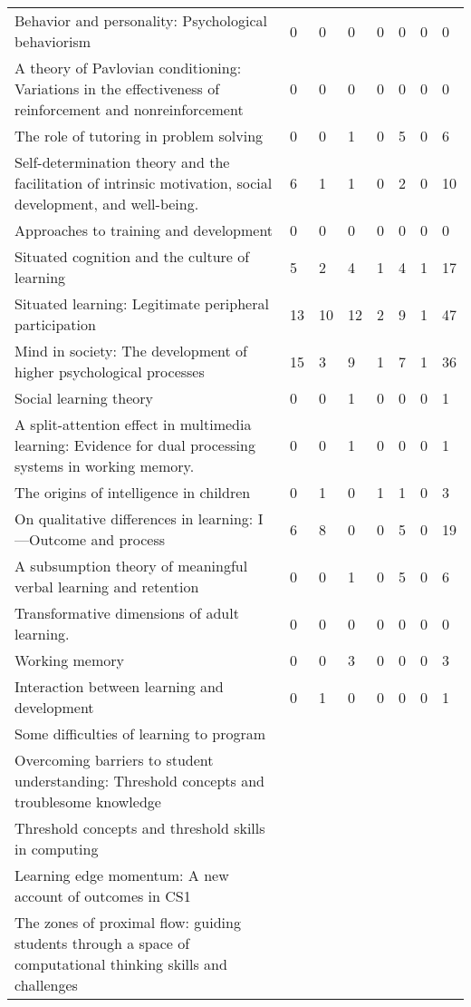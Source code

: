 \begin{table*}[t]
\begin{tabular}{p{10cm}lllllll}
Behavior and personality: Psychological behaviorism & 0 & 0 & 0 & 0 & 0 & 0 & 0\\
A theory of Pavlovian conditioning: Variations in the effectiveness of reinforcement and nonreinforcement & 0 & 0 & 0 & 0 & 0 & 0 & 0\\
The role of tutoring in problem solving & 0 & 0 & 1 & 0 & 5 & 0 & 6\\
Self-determination theory and the facilitation of intrinsic motivation, social development, and well-being. & 6 & 1 & 1 & 0 & 2 & 0 & 10\\
Approaches to training and development & 0 & 0 & 0 & 0 & 0 & 0 & 0\\
Situated cognition and the culture of learning & 5 & 2 & 4 & 1 & 4 & 1 & 17\\
Situated learning: Legitimate peripheral participation & 13 & 10 & 12 & 2 & 9 & 1 & 47\\
Mind in society: The development of higher psychological processes & 15 & 3 & 9 & 1 & 7 & 1 & 36\\
Social learning theory & 0 & 0 & 1 & 0 & 0 & 0 & 1\\
A split-attention effect in multimedia learning: Evidence for dual processing systems in working memory. & 0 & 0 & 1 & 0 & 0 & 0 & 1\\
The origins of intelligence in children & 0 & 1 & 0 & 1 & 1 & 0 & 3\\
On qualitative differences in learning: I—Outcome and process & 6 & 8 & 0 & 0 & 5 & 0 & 19\\
A subsumption theory of meaningful verbal learning and retention & 0 & 0 & 1 & 0 & 5 & 0 & 6\\
Transformative dimensions of adult learning. & 0 & 0 & 0 & 0 & 0 & 0 & 0\\
Working memory & 0 & 0 & 3 & 0 & 0 & 0 & 3\\
Interaction between learning and development & 0 & 1 & 0 & 0 & 0 & 0 & 1\\
Some difficulties of learning to program &  &  &  &  &  &  & \\
Overcoming barriers to student understanding: Threshold concepts and troublesome knowledge &  &  &  &  &  &  & \\
Threshold concepts and threshold skills in computing &  &  &  &  &  &  & \\
Learning edge momentum: A new account of outcomes in CS1 &  &  &  &  &  &  & \\
The zones of proximal flow: guiding students through a space of computational thinking skills and challenges &  &  &  &  &  &  & \\

\end{tabular}
\end{table*}
